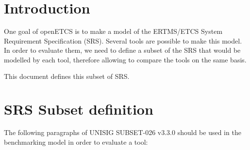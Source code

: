 \documentclass{template/openetcs_article}
\begin{document}
\setlength{\marginparwidth}{1in}
\let\oldmarginpar\marginpar
\renewcommand\marginpar[1]{\-\oldmarginpar[\raggedleft\scriptsize #1]%
{\raggedright\scriptsize #1}}

\newcommand{\oldtext}[1]{{Old: \scriptsize #1}}

\newenvironment{inoutput}
{\vspace{2mm}
\noindent
\begin{tabular}{|r|p{.68\linewidth}|l|}
\hline}
{
\hline
\end{tabular}}

\section{Introduction}

One goal of openETCS is to make a model of the ERTMS/ETCS System
Requirement Specification (SRS). Several tools are possible to make
this model. In order to evaluate them, we need to define a subset of
the SRS that would be modelled by each tool, therefore allowing to
compare the tools on the same basis.

This document defines this subset of SRS.

\section{SRS Subset definition}

The following paragraphs of UNISIG SUBSET-026 v3.3.0 should be used
in the benchmarking model in order to evaluate a tool:
\end{document}
